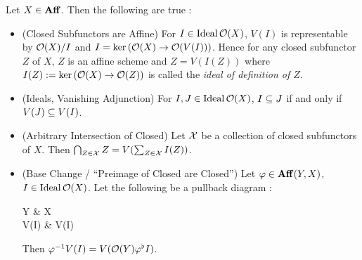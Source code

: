 \documentclass[../main.tex]{subfiles}
\begin{document}
\begin{prop}
  
  Let $X \in \mathbf{Aff}$.
  Then the following are true : 
  \begin{itemize}
    \item (Closed Subfunctors are Affine) 
    For $I \in \operatorname{Ideal}\mathcal{O}(X)$,
    $V(I)$ is representable by $\mathcal{O}(X)/I$ and
    $I = \ker \left(\mathcal{O}(X) \to \mathcal{O}(V(I))\right)$.
    Hence for any closed subfunctor $Z$ of $X$,
    $Z$ is an affine scheme and 
    $Z = V(I(Z))$ where $I(Z) := \ker \left(\mathcal{O}(X) \to \mathcal{O}(Z)\right)$
    is called the \emph{ideal of definition of $Z$}.

    \item (Ideals, Vanishing Adjunction)
    For $I, J \in \operatorname{Ideal} \mathcal{O}(X)$,
    $I \subseteq J$ if and only if $V(J) \subseteq V(I)$.

    \item (Arbitrary Intersection of Closed)
    Let $\mathcal{X}$ be a collection of closed subfunctors of $X$.
    Then $\bigcap_{Z \in \mathcal{X}} Z = V(\sum_{Z \in \mathcal{X}}^{} I(Z))$.
    
    \item (Base Change / ``Preimage of Closed are Closed'')
    Let $\varphi \in \mathbf{Aff}(Y,X)$, $I \in \operatorname{Ideal} \mathcal{O}(X)$.
    Let the following be a pullback diagram : 
    \begin{cd}
      Y \ar[r,"\ph"] & X \\
      \ph\inv V(I) \ar[u] \ar[r] & V(I) \ar[u]
    \end{cd}
    Then $\varphi^{-1} V(I) = V(\mathcal{O}(Y)\varphi^\flat I)$.
  \end{itemize}
\end{prop}
\end{document}

